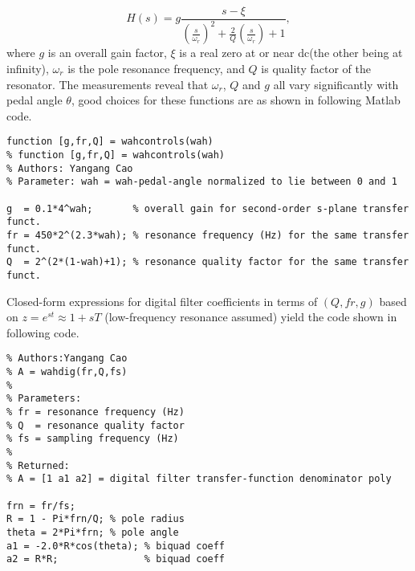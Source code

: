 \documentclass[10pt,a4paper,oneside]{article}
\begin{document}
\[
H(s) = g\frac{s-\xi}{(\frac{s}{\omega_r})^2 + \frac{2}{Q}(\frac{s}{\omega_r})+1},
\]
where $g$ is an overall gain factor, $\xi$ is a real zero at or near dc(the other being at infinity), $\omega_r$ is the pole resonance frequency, and $Q$ is quality factor of the resonator. The measurements reveal that $\omega_r$, $Q$ and $g$ all vary significantly with pedal angle $\theta$, good choices for these functions are as shown in following Matlab code.
\begin{lstlisting}
function [g,fr,Q] = wahcontrols(wah)
% function [g,fr,Q] = wahcontrols(wah)
% Authors: Yangang Cao
% Parameter: wah = wah-pedal-angle normalized to lie between 0 and 1

g  = 0.1*4^wah;       % overall gain for second-order s-plane transfer funct.
fr = 450*2^(2.3*wah); % resonance frequency (Hz) for the same transfer funct.
Q  = 2^(2*(1-wah)+1); % resonance quality factor for the same transfer funct.
\end{lstlisting}

Closed-form expressions for digital filter coefficients in terms of $(Q, fr, g)$ based on $z = e^{st} \approx 1 + sT$ (low-frequency resonance assumed) yield the code shown in following code.
\begin{lstlisting}
% Authors:Yangang Cao
% A = wahdig(fr,Q,fs)
% 
% Parameters:
% fr = resonance frequency (Hz)
% Q  = resonance quality factor
% fs = sampling frequency (Hz)
%
% Returned:
% A = [1 a1 a2] = digital filter transfer-function denominator poly

frn = fr/fs;
R = 1 - Pi*frn/Q; % pole radius
theta = 2*Pi*frn; % pole angle
a1 = -2.0*R*cos(theta); % biquad coeff
a2 = R*R;               % biquad coeff

\end{lstlisting}
\end{document}
